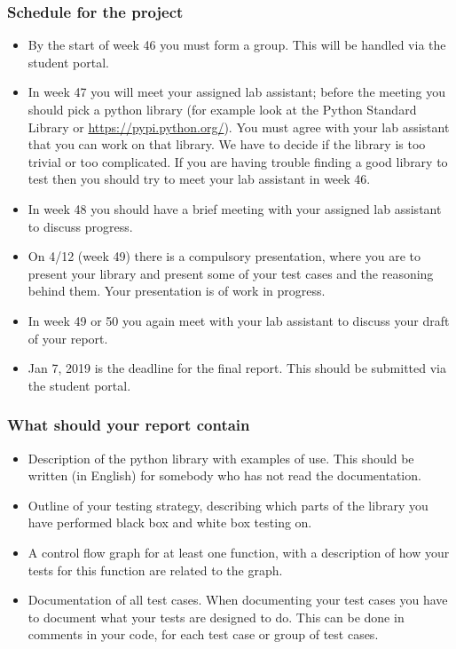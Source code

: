 \documentclass[a4page]{article}
\begin{document}
\subsubsection*{Schedule for the project}
  \begin{itemize}
  \item By  the start of  week  46 you must form a group. This will be
    handled via the student portal.
  \item In week 47 you will meet your assigned lab assistant; before the
    meeting you should pick a python library (for example look at the Python
    Standard Library or \url{https://pypi.python.org/}). You must agree
    with your lab assistant that you can work on that library. We have
    to decide if the library is too trivial or too complicated. If you are
    having trouble finding a good library to test then you should try to meet
    your lab assistant in week 46.
  \item In week 48 you should have a brief meeting with your assigned lab
    assistant to discuss progress.

  \item On 4/12 (week 49) there is a compulsory presentation, where you are
      to present your library and present some of your test cases
      and the reasoning behind them. Your presentation is of work in
      progress.
    \item In week 49 or 50 you again meet with your lab assistant to
      discuss your draft of your  report.
    \item Jan 7,  2019 is  the deadline for the final
      report. This should be submitted via the student portal.

\end{itemize}



  \subsubsection*{What should your report contain}
  \begin{itemize}
  \item Description of the python library with examples of use. 
  This should be written (in English) for somebody who has not read the documentation.
  \item Outline of your testing strategy, describing which parts of the library 
    you have performed black box and white box testing on.
  \item A control flow graph for at least one function, with a description of 
    how your tests for this function are related to the graph.
  \item Documentation of all test cases.  When documenting your test cases
    you have to document what your tests are designed to do. This can be done
    in comments in your code, for each test case or group of test cases.
  \end{itemize}
\end{document}
